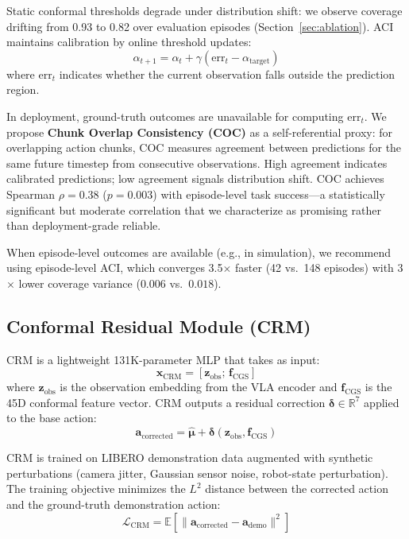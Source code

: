 \documentclass[letterpaper]{article}
\begin{document}
Static conformal thresholds degrade under distribution shift: we observe coverage drifting from 0.93 to 0.82 over evaluation episodes (Section~\ref{sec:ablation}).
ACI~\cite{aci} maintains calibration by online threshold updates:
\begin{equation}
    \alpha_{t+1} = \alpha_t + \gamma(\text{err}_t - \alpha_{\text{target}})
\end{equation}
where $\text{err}_t$ indicates whether the current observation falls outside the prediction region.

In deployment, ground-truth outcomes are unavailable for computing $\text{err}_t$.
We propose \textbf{Chunk Overlap Consistency (COC)} as a self-referential proxy: for overlapping action chunks, COC measures agreement between predictions for the same future timestep from consecutive observations.
High agreement indicates calibrated predictions; low agreement signals distribution shift.
COC achieves Spearman $\rho{=}0.38$ ($p{=}0.003$) with episode-level task success---a statistically significant but moderate correlation that we characterize as promising rather than deployment-grade reliable.

When episode-level outcomes are available (e.g., in simulation), we recommend using episode-level ACI, which converges 3.5$\times$ faster (42 vs.\ 148 episodes) with 3$\times$ lower coverage variance ($0.006$ vs.\ $0.018$).

\subsection{Conformal Residual Module (CRM)}
\label{sec:crm}

CRM is a lightweight 131K-parameter MLP that takes as input:
\begin{equation}
    \mathbf{x}_{\text{CRM}} = [\mathbf{z}_{\text{obs}};\, \mathbf{f}_{\text{CGS}}]
\end{equation}
where $\mathbf{z}_{\text{obs}}$ is the observation embedding from the VLA encoder and $\mathbf{f}_{\text{CGS}}$ is the 45D conformal feature vector.
CRM outputs a residual correction $\boldsymbol{\delta} \in \mathbb{R}^{7}$ applied to the base action:
\begin{equation}
    \mathbf{a}_{\text{corrected}} = \hat{\boldsymbol{\mu}} + \boldsymbol{\delta}(\mathbf{z}_{\text{obs}}, \mathbf{f}_{\text{CGS}})
\end{equation}

CRM is trained on LIBERO demonstration data augmented with synthetic perturbations (camera jitter, Gaussian sensor noise, robot-state perturbation).
The training objective minimizes the $L^2$ distance between the corrected action and the ground-truth demonstration action:
\begin{equation}
    \mathcal{L}_{\text{CRM}} = \mathbb{E}\left[\|\mathbf{a}_{\text{corrected}} - \mathbf{a}_{\text{demo}}\|^2\right]
\end{equation}
\end{document}
